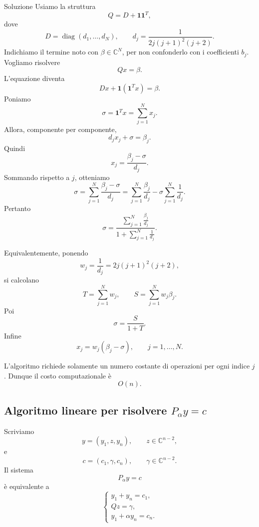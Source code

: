\documentclass[a4paper]{article}
\begin{document}
\begin{snippetsolution}{Soluzione}
    Usiamo la struttura
    \[
        Q=D+\mathbf{1}\mathbf{1}^T,
    \]
    dove
    \[
        D=\operatorname{diag}(d_1,\dots,d_N),
        \qquad
        d_j=\frac{1}{2j(j+1)^2(j+2)}.
    \]
    Indichiamo il termine noto con \(\beta\in\mathbb{C}^N\), per non confonderlo con i coefficienti \(b_j\). Vogliamo risolvere
    \[
        Qx=\beta.
    \]
    L'equazione diventa
    \[
        Dx+\mathbf{1}(\mathbf{1}^Tx)=\beta.
    \]
    Poniamo
    \[
        \sigma=\mathbf{1}^Tx=\sum_{j=1}^N x_j.
    \]
    Allora, componente per componente,
    \[
        d_jx_j+\sigma=\beta_j.
    \]
    Quindi
    \[
        x_j=\frac{\beta_j-\sigma}{d_j}.
    \]
    Sommando rispetto a \(j\), otteniamo
    \[
        \sigma
        =
        \sum_{j=1}^N \frac{\beta_j-\sigma}{d_j}
        =
        \sum_{j=1}^N \frac{\beta_j}{d_j}
        -
        \sigma\sum_{j=1}^N \frac{1}{d_j}.
    \]
    Pertanto
    \[
        \sigma
        =
        \frac{
            \displaystyle\sum_{j=1}^N \frac{\beta_j}{d_j}
        }{
            \displaystyle 1+\sum_{j=1}^N \frac{1}{d_j}
        }.
    \]

    Equivalentemente, ponendo
    \[
        w_j=\frac{1}{d_j}=2j(j+1)^2(j+2),
    \]
    si calcolano
    \[
        T=\sum_{j=1}^N w_j,
        \qquad
        S=\sum_{j=1}^N w_j\beta_j.
    \]
    Poi
    \[
        \sigma=\frac{S}{1+T}.
    \]
    Infine
    \[
        x_j=w_j(\beta_j-\sigma),
        \qquad
        j=1,\dots,N.
    \]

    L'algoritmo richiede solamente un numero costante di operazioni per ogni indice \(j\). Dunque il costo computazionale è
    \[
        \boxed{
            O(n).
        }
    \]

    \subsection*{Algoritmo lineare per risolvere \(P_\alpha y=c\)}

    Scriviamo
    \[
        y=(y_1,z,y_n),
        \qquad
        z\in\mathbb{C}^{n-2},
    \]
    e
    \[
        c=(c_1,\gamma,c_n),
        \qquad
        \gamma\in\mathbb{C}^{n-2}.
    \]
    Il sistema
    \[
        P_\alpha y=c
    \]
    è equivalente a
    \[
        \begin{cases}
            y_1+y_n=c_1,\\
            Qz=\gamma,\\
            y_1+\alpha y_n=c_n.
        \end{cases}
    \]


\end{snippetsolution}
\end{document}
